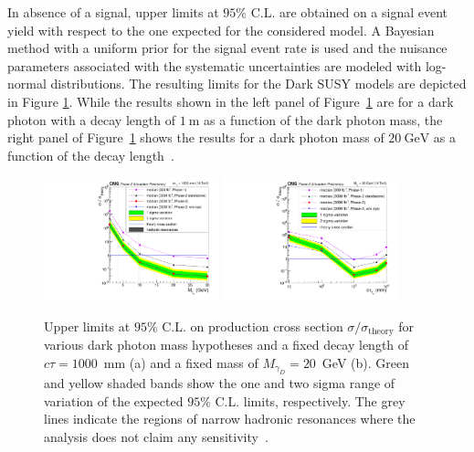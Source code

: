 In absence of a signal, upper limits at $95\%$ C.L. are obtained on a signal
event yield with respect to the one expected for the considered model. A Bayesian method with a uniform prior for the signal event rate is used and the nuisance
parameters associated with the systematic uncertainties are modeled with log-normal distributions.
The resulting limits for the Dark SUSY models are depicted in Figure \ref{fig:NewCompLimit_DarkPhoton}. While the results shown in the left panel of Figure~\ref{fig:NewCompLimit_DarkPhoton} are for a dark photon with a decay length of $1~\mathrm{m}$ as a function of the dark photon mass, the right panel of Figure~\ref{fig:NewCompLimit_DarkPhoton} shows the results for a dark photon mass of $20~\mathrm{GeV}$ as a function of the decay length~\cite{CMS-PAS-FTR-18-002}.



\begin{figure}[hbtp]
\begin{center}
\includegraphics[width=0.45\textwidth]{tex/figures/cmsupgrade/FTR-18-002/LimitComp_Ratio_DarkPhotons.pdf}
\includegraphics[width=0.45\textwidth]{tex/figures/cmsupgrade/FTR-18-002/LimitComp_Ratio_asfuncofCtau_DarkPhotons.pdf}
 \caption{Upper limits at $95\%$ C.L. on production cross section $\sigma / \sigma_{\text{theory}}$ for various dark photon mass hypotheses and a fixed decay length of $c\tau = 1000$~mm (a) and a fixed mass of $M_{\gamma_D} = 20$~GeV (b). Green and yellow shaded bands show the one and two sigma range of variation of the expected $95\%$ C.L. limits, respectively. The grey lines indicate the regions of narrow hadronic resonances where the analysis does not claim any sensitivity~\cite{CMS-PAS-FTR-18-002}.}
\label{fig:NewCompLimit_DarkPhoton}
\end{center}
\end{figure}


